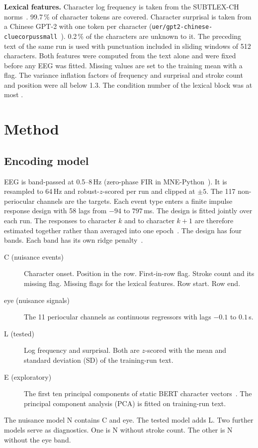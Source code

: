 \documentclass[sigconf]{acmart}
\begin{document}
\begin{table}
\caption{Timing gate for all ten participants.}
\label{tab:gate}
\footnotesize
\setlength{\tabcolsep}{3.5pt}

\end{table}

\textbf{Lexical features.} Character log frequency is taken from the SUBTLEX-CH norms~\cite{cai2010subtlex}. 99.7\,\% of character tokens are covered. Character surprisal is taken from a Chinese GPT-2 with one token per character (\nolinkurl{uer/gpt2-chinese-cluecorpussmall}~\cite{zhao2019uer}). 0.2\,\% of the characters are unknown to it. The preceding text of the same run is used with punctuation included in sliding windows of 512 characters. Both features were computed from the text alone and were fixed before any EEG was fitted. Missing values are set to the training mean with a flag. The variance inflation factors of frequency and surprisal and stroke count and position were all below 1.3. The condition number of the lexical block was at most \condL.

\section{Method}
\label{sec:method}
\subsection{Encoding model}
EEG is band-passed at 0.5--8\,Hz (zero-phase FIR in MNE-Python~\cite{gramfort2013mne}). It is resampled to 64\,Hz and robust-$z$-scored per run and clipped at $\pm5$. The 117 non-periocular channels are the targets. Each event type enters a finite impulse response design with 58 lags from $-94$ to $797$\,ms. The design is fitted jointly over each run. The responses to character $k$ and to character $k+1$ are therefore estimated together rather than averaged into one epoch~\cite{smith2015regression,ehinger2019unfold}. The design has four bands. Each band has its own ridge penalty~\cite{duprelatour2022banded}.
\begin{description}
\item[C (nuisance events)] Character onset. Position in the row. First-in-row flag. Stroke count and its missing flag. Missing flags for the lexical features. Row start. Row end.
\item[eye (nuisance signals)] The 11 periocular channels as continuous regressors with lags $-0.1$ to $0.1$\,s.
\item[L (tested)] Log frequency and surprisal. Both are $z$-scored with the mean and standard deviation (SD) of the training-run text.
\item[E (exploratory)] The first ten principal components of static BERT character vectors~\cite{devlin2019bert}. The principal component analysis (PCA) is fitted on training-run text.
\end{description}
The nuisance model N contains C and eye. The tested model adds L. Two further models serve as diagnostics. One is N without stroke count. The other is N without the eye band.
\end{document}

